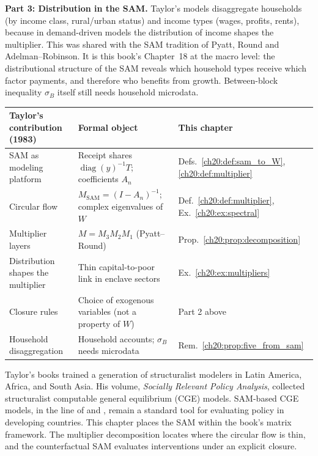 \documentclass[../structural_economics_book.tex]{subfiles}
\begin{document}
\textbf{Part 3: Distribution in the SAM.} Taylor's models disaggregate households (by income class, rural/urban status) and income types (wages, profits, rents), because in demand-driven models the distribution of income shapes the multiplier. This was shared with the SAM tradition of Pyatt, Round and Adelman--Robinson. It is this book's Chapter~18 at the macro level: the distributional structure of the SAM reveals which household types receive which factor payments, and therefore who benefits from growth. Between-block inequality $\sigma_B$ itself still needs household microdata.

\begin{center}
\begin{tabularx}{\textwidth}{LLL}
\toprule
\textbf{Taylor's contribution (1983)} & \textbf{Formal object} & \textbf{This chapter} \\
\midrule
SAM as modeling platform & Receipt shares $\operatorname{diag}(y)^{-1}T$; coefficients $A_n$ & Defs.~\ref{ch20:def:sam_to_W}, \ref{ch20:def:multiplier} \\
Circular flow & $M_{\text{SAM}} = (I - A_n)^{-1}$; complex eigenvalues of $W$ & Def.~\ref{ch20:def:multiplier}, Ex.~\ref{ch20:ex:spectral} \\
Multiplier layers & $M = M_3 M_2 M_1$ (Pyatt--Round) & Prop.~\ref{ch20:prop:decomposition} \\
Distribution shapes the multiplier & Thin capital-to-poor link in enclave sectors & Ex.~\ref{ch20:ex:multipliers} \\
Closure rules & Choice of exogenous variables (not a property of $W$) & Part 2 above \\
Household disaggregation & Household accounts; $\sigma_B$ needs microdata & Rem.~\ref{ch20:prop:five_from_sam} \\
\bottomrule
\end{tabularx}
\end{center}

Taylor's books \citeyearpar{taylor1983structuralist,taylor1990socially,taylor2004reconstructing} trained a generation of structuralist modelers in Latin America, Africa, and South Asia. His \citeyear{taylor1990socially} volume, \textit{Socially Relevant Policy Analysis}, collected structuralist computable general equilibrium (CGE) models. SAM-based CGE models, in the line of \citet*{dervis1982general} and \citet*{lofgren2002standard}, remain a standard tool for evaluating policy in developing countries. This chapter places the SAM within the book's matrix framework. The multiplier decomposition locates where the circular flow is thin, and the counterfactual SAM evaluates interventions under an explicit closure.
\end{document}
